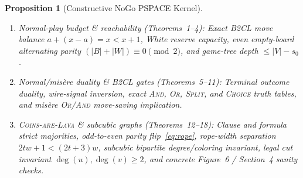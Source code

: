 \documentclass[11pt,twocolumn]{article}
\newtheorem{proposition}{Proposition}
\begin{document}
\begin{proposition}[Constructive NoGo PSPACE Kernel]\label{prop:lean}
\leavevmode
\begin{enumerate}[leftmargin=*,nosep]
  \item \emph{Normal-play budget \& reachability (Theorems~1--4):} Exact B2CL move balance $a+(x-a)=x < x+1$, White reserve capacity, even empty-board alternating parity $(|B|+|W|)\equiv 0 \pmod 2$, and game-tree depth $\le |V|-s_0$.
  \item \emph{Normal/mis\`ere duality \& B2CL gates (Theorems~5--11):} Terminal outcome duality, wire-signal inversion, exact \textsc{And}, \textsc{Or}, \textsc{Split}, and \textsc{Choice} truth tables, and mis\`ere \textsc{Or}/\textsc{And} move-saving implication.
  \item \emph{\textsc{Coins-are-Lava} \& subcubic graphs (Theorems~12--18):} Clause and formula strict majorities, odd-to-even parity flip~\eqref{eq:rope}, rope-width separation $2tw+1 < (2t+3)w$, subcubic bipartite degree/coloring invariant, legal cut invariant $\deg(u),\deg(v) \ge 2$, and concrete Figure~6 / Section~4 sanity checks.
\end{enumerate}
\end{proposition}
\end{document}

